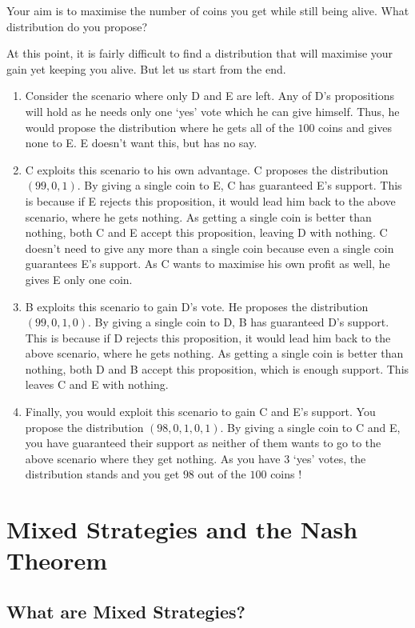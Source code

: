 \documentclass{article}
\theoremstyle{definition}
\begin{document}
Your aim is to maximise the number of coins you get while still being alive. What distribution do you propose? \bigskip

At this point, it is fairly difficult to find a distribution that will maximise your gain yet keeping you alive. But let us start from the end. 

\begin{enumerate}
    \item Consider the scenario where only D and E are left. Any of D's propositions will hold as he needs only one `yes' vote which he can give himself. Thus, he would propose the distribution where he gets all of the $100$ coins and gives none to E. E doesn't want this, but has no say.
    \item C exploits this scenario to his own advantage. C proposes the distribution $(99, 0 , 1)$. By giving a single coin to E, C has guaranteed E's support. This is because if E rejects this proposition, it would lead him back to the above scenario, where he gets nothing. As getting a single coin is better than nothing, both C and E accept this proposition, leaving D with nothing. C doesn't need to give any more than a single coin because even a single coin guarantees E's support. As C wants to maximise his own profit as well, he gives E only one coin.
    \item B exploits this scenario to gain D's vote. He proposes the distribution $(99, 0 , 1 , 0)$. By giving a single coin to D, B has guaranteed D's support. This is because if D rejects this proposition, it would lead him back to the above scenario, where he gets nothing. As getting a single coin is better than nothing, both D and B accept this proposition, which is enough support. This leaves C and E with nothing. 
    \item Finally, you would exploit this scenario to gain C and E's support. You propose the distribution $(98, 0 , 1, 0 ,1)$. By giving a single coin to C and E, you have guaranteed their support as neither of them wants to go to the above scenario where they get nothing. As you have 3 `yes' votes, the distribution stands and you get $98$ out of the $100$ coins !
\end{enumerate}

\section{Mixed Strategies and the Nash Theorem}

\subsection{What are Mixed Strategies?}
\end{document}
